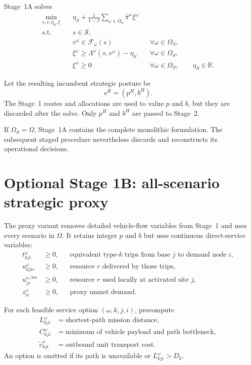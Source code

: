 \documentclass[11pt]{article}
\newcommand{\R}{\mathbb{R}}
\begin{document}
Stage~1A solves
\begin{align}
\min_{s,v,\eta_S,\xi}\quad
&\eta_S+
\frac{1}{1-\beta}
\sum_{\omega\in\Omega_S}\widehat\pi^\omega\xi^\omega
\label{eq:stage1-objective}\\
\text{s.t.}\quad
&s\in\mathcal S,
\label{eq:stage1-strategic}\\
&v^\omega\in\mathcal F_\omega(s)
&&\forall\omega\in\Omega_S,
\label{eq:stage1-recourse}\\
&\xi^\omega\geq
\Lambda^\omega(s,v^\omega)-\eta_S
&&\forall\omega\in\Omega_S,
\label{eq:stage1-cvar}\\
&\xi^\omega\geq0
&&\forall\omega\in\Omega_S,
\qquad \eta_S\in\R.
\end{align}

Let the resulting incumbent strategic posture be
\begin{equation}
s^H=(p^H,b^H).
\label{eq:strategic-incumbent}
\end{equation}
The Stage~1 routes and allocations are used to value $p$ and $b$, but they are
discarded after the solve.  Only $p^H$ and $b^H$ are passed to Stage~2.

If $\Omega_S=\Omega$, Stage~1A contains the complete monolithic formulation.
The subsequent staged procedure nevertheless discards and reconstructs its
operational decisions.

\section{Optional Stage 1B: all-scenario strategic proxy}

The proxy variant removes detailed vehicle-flow variables from Stage~1 and
uses every scenario in $\Omega$.  It retains integer $p$ and $b$ but uses
continuous direct-service variables:
\begin{align*}
t^\omega_{kji}&\geq0,
&&\text{equivalent type-$k$ trips from base $j$ to demand node $i$},\\
u^\omega_{kjir}&\geq0,
&&\text{resource $r$ delivered by those trips},\\
u^{\omega,\mathrm{loc}}_{jr}&\geq0,
&&\text{resource $r$ used locally at activated site $j$},\\
z^\omega_{ir}&\geq0,
&&\text{proxy unmet demand}.
\end{align*}

For each feasible service option $(\omega,k,j,i)$, precompute
\begin{align*}
L^\omega_{kji}&=\text{shortest-path mission distance},\\
C^\omega_{kji}&=\text{minimum of vehicle payload and path bottleneck},\\
\widetilde c^\omega_{kji}&=\text{outbound unit transport cost}.
\end{align*}
An option is omitted if its path is unavailable or
$L^\omega_{kji}>D_k$.
\end{document}
